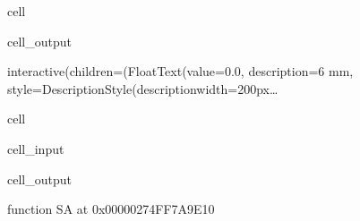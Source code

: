 \documentclass[letterpaper,10pt,english]{jupyterBook}
\begin{document}
\begin{sphinxuseclass}{cell}
\begin{sphinxVerbatimOutput}
\begin{sphinxuseclass}{cell_output}
\begin{sphinxVerbatim}[commandchars=\\\{\}]
interactive(children=(FloatText(value=0.0, description=\PYGZsq{}6 mm\PYGZsq{}, style=DescriptionStyle(description\PYGZus{}width=\PYGZsq{}200px…
\end{sphinxVerbatim}

\end{sphinxuseclass}\end{sphinxVerbatimOutput}

\end{sphinxuseclass}
\begin{sphinxuseclass}{cell}\begin{sphinxVerbatimInput}

\begin{sphinxuseclass}{cell_input}
\begin{sphinxVerbatim}[commandchars=\\\{\}]
\end{sphinxVerbatim}

\end{sphinxuseclass}\end{sphinxVerbatimInput}
\begin{sphinxVerbatimOutput}

\begin{sphinxuseclass}{cell_output}
\begin{sphinxVerbatim}[commandchars=\\\{\}]
\PYGZlt{}function SA at 0x00000274FF7A9E10\PYGZgt{}
\end{sphinxVerbatim}

\end{sphinxuseclass}\end{sphinxVerbatimOutput}

\end{sphinxuseclass}
\sphinxAtStartPar
{}
\end{document}
